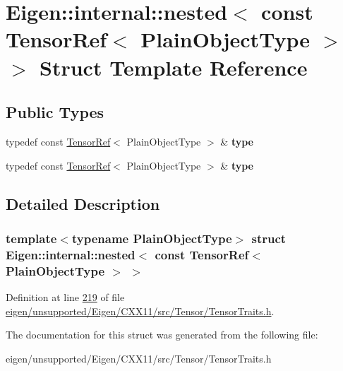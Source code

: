 \hypertarget{struct_eigen_1_1internal_1_1nested_3_01const_01_tensor_ref_3_01_plain_object_type_01_4_01_4}{}\section{Eigen\+:\+:internal\+:\+:nested$<$ const Tensor\+Ref$<$ Plain\+Object\+Type $>$ $>$ Struct Template Reference}
\label{struct_eigen_1_1internal_1_1nested_3_01const_01_tensor_ref_3_01_plain_object_type_01_4_01_4}
\subsection*{Public Types}
\begin{DoxyCompactItemize}
\item 
\mbox{\label{struct_eigen_1_1internal_1_1nested_3_01const_01_tensor_ref_3_01_plain_object_type_01_4_01_4_ab3df71450cd0d4098b7e2a289e48a3e5}} 
typedef const \hyperlink{class_eigen_1_1_tensor_ref}{Tensor\+Ref}$<$ Plain\+Object\+Type $>$ \& {\bfseries type}
\item 
\mbox{\label{struct_eigen_1_1internal_1_1nested_3_01const_01_tensor_ref_3_01_plain_object_type_01_4_01_4_ab3df71450cd0d4098b7e2a289e48a3e5}} 
typedef const \hyperlink{class_eigen_1_1_tensor_ref}{Tensor\+Ref}$<$ Plain\+Object\+Type $>$ \& {\bfseries type}
\end{DoxyCompactItemize}


\subsection{Detailed Description}
\subsubsection*{template$<$typename Plain\+Object\+Type$>$\newline
struct Eigen\+::internal\+::nested$<$ const Tensor\+Ref$<$ Plain\+Object\+Type $>$ $>$}



Definition at line \hyperlink{eigen_2unsupported_2_eigen_2_c_x_x11_2src_2_tensor_2_tensor_traits_8h_source_l00219}{219} of file \hyperlink{eigen_2unsupported_2_eigen_2_c_x_x11_2src_2_tensor_2_tensor_traits_8h_source}{eigen/unsupported/\+Eigen/\+C\+X\+X11/src/\+Tensor/\+Tensor\+Traits.\+h}.



The documentation for this struct was generated from the following file\+:\begin{DoxyCompactItemize}
\item 
eigen/unsupported/\+Eigen/\+C\+X\+X11/src/\+Tensor/\+Tensor\+Traits.\+h\end{DoxyCompactItemize}
